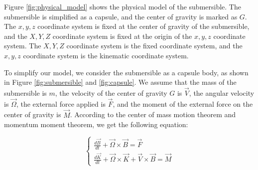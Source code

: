\documentclass[12pt]{article}
\begin{document}
Figure \ref{fig:physical_model} shows the physical model of the submersible. The submersible is simplified as a capsule, and the center of gravity is marked as $G$. The $x,y,z$ coordinate system is fixed at the center of gravity of the submersible, and the $X, Y, Z$ coordinate system is fixed at the origin of the $x, y, z$ coordinate system. The $X, Y, Z$ coordinate system is the fixed coordinate system, and the $x, y, z$ coordinate system is the kinematic coordinate system.

\begin{figure}
    \centering
\end{figure}


To simplify our model, we consider the submersible as a capsule body, as shown in Figure \ref{fig:submersible} and \ref{fig:capsule}. We assume that the mass of the submersible is $m$, the velocity of the center of gravity $G$ is $\vec{V}$, the angular velocity is $\vec{\Omega}$, the external force applied is $\vec{F}$, and the moment of the external force on the center of gravity is $\vec{M}$. According to the center of mass motion theorem and momentum moment theorem, we get the following equation:

\begin{equation}
    \left\{
    \begin{aligned}
        \frac{d\vec{B}}{dt}+\vec{\Omega}\times\vec{B}=\vec{F} \\
        \frac{d\vec{K}}{dt}+\vec{\Omega}\times\vec{K}+\vec{V}\times\vec{B}=\vec{M}
    \end{aligned}
    \right.
\end{equation}
\end{document}
